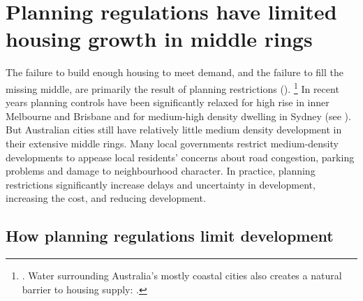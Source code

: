 \section{Planning regulations have limited housing growth in middle rings}\label{sec:the-major-problem-is-planning-regulations}

The failure to build enough housing to meet demand, and the failure to fill the missing middle, are primarily the result of planning restrictions ().%
    \footnote{\textcites{Kendall_Tulip_2018_zoning}{KellyWeidmannWalsh2011}[][20]{Treasury2010HousingSupply}{RowleyPhibbs2012}{Shoory2016Apartment}{SGS2017popgrowth}.
    Water surrounding Australia's mostly coastal cities also creates a natural barrier to housing supply: \textcites{GlaeserGyourko2003BuildRestriction}{GlaeserGyourko2017EconImplications}.}
In recent years planning controls have been significantly relaxed for high rise in inner Melbourne and Brisbane and for medium-high density dwelling in Sydney (see ).
But Australian cities still have relatively little medium density development in their extensive middle rings.
Many local governments restrict medium-density developments to appease local residents' concerns about road congestion, parking problems and damage to neighbourhood character.
In practice, planning restrictions significantly increase delays and uncertainty in development, increasing the cost, and reducing development.

\subsection{How planning regulations limit development}\label{subsec:impact-of-planning-regulations}

